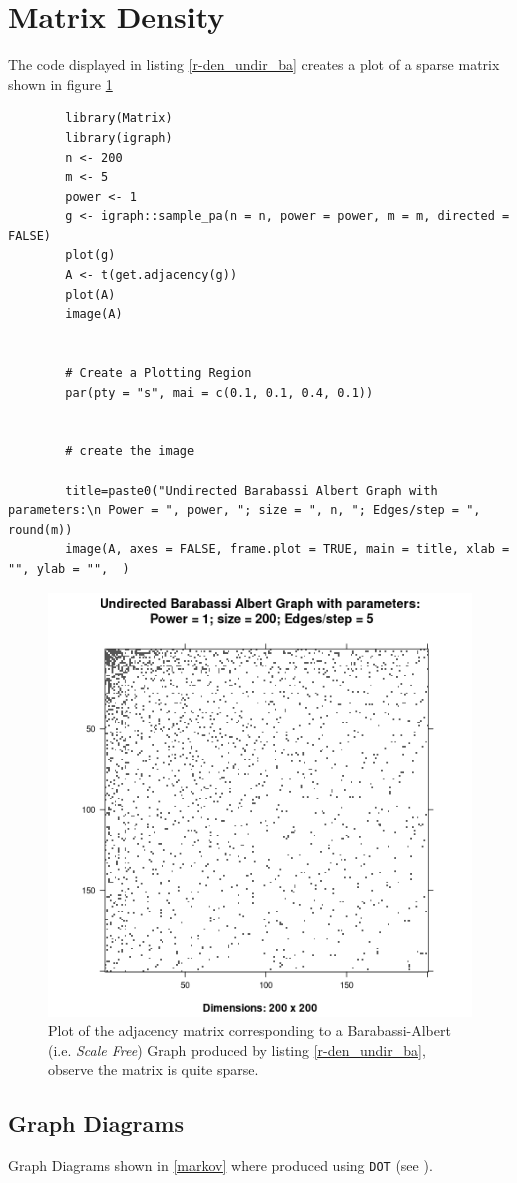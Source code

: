 \documentclass[11pt]{report}
\begin{document}
\section{Matrix Density}
The  code displayed in listing \ref{r-den_undir_ba} creates a plot of a sparse matrix shown in figure \ref{fig:den_undir_ba}
\begin{listing}[htbp]
    \begin{tcolorbox}
        \begin{verbatim}
        library(Matrix)
        library(igraph)
        n <- 200
        m <- 5
        power <- 1
        g <- igraph::sample_pa(n = n, power = power, m = m, directed = FALSE)
        plot(g)
        A <- t(get.adjacency(g))
        plot(A)
        image(A)


        # Create a Plotting Region
        par(pty = "s", mai = c(0.1, 0.1, 0.4, 0.1))


        # create the image

        title=paste0("Undirected Barabassi Albert Graph with parameters:\n Power = ", power, "; size = ", n, "; Edges/step = ", round(m))
        image(A, axes = FALSE, frame.plot = TRUE, main = title, xlab = "", ylab = "",  )
        \end{verbatim}
    \end{tcolorbox}
\caption{\label{r-den_undir_ba}\textbf{\emph{R}} code to produce an image illustrating the density of a simulated Barabasi-Albert graph, the \emph{Barabasi-Albert} graph is a good analogue for the link structure of the internet \cite{langvilleGooglePageRankScience2012,barabasiPhysicsWeb2001,barabasiScalefreeCharacteristicsRandom2000} see the output in figure \ref{fig:den_undir_ba}}
\end{listing}

\begin{figure}[htbp]
\centering
\includegraphics[width=12cm]{media/DensityUndirectedBA.png}
\caption{\label{fig:den_undir_ba}Plot of the adjacency matrix corresponding to a Barabassi-Albert (i.e. \emph{Scale Free}) Graph produced by listing \ref{r-den_undir_ba}, observe the matrix is quite sparse.}
\end{figure}
\subsection{Graph Diagrams}
\label{sec:orgc4aeb84}
Graph Diagrams shown in \ref{markov} where produced using \texttt{DOT} (see \cite{DOTLanguage,DOTGraphDescription2020}).
\end{document}
